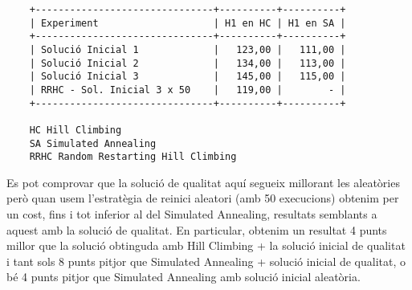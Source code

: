 \begin{verbatim}
	+-------------------------------+----------+----------+
	| Experiment                    | H1 en HC | H1 en SA |
	+-------------------------------+----------+----------+
	| Solució Inicial 1             |   123,00 |   111,00 |
	| Solució Inicial 2             |   134,00 |   113,00 |
	| Solució Inicial 3             |   145,00 |   115,00 |
	| RRHC - Sol. Inicial 3 x 50    |   119,00 |        - |
	+-------------------------------+----------+----------+

	HC Hill Climbing
	SA Simulated Annealing
	RRHC Random Restarting Hill Climbing
\end{verbatim}

                                          
Es pot comprovar que la solució de qualitat aquí segueix millorant les aleatòries però quan usem l'estratègia de reinici aleatori (amb 50 execucions) obtenim per un cost, fins i tot inferior al del Simulated Annealing, resultats semblants a aquest amb la solució de qualitat. En particular, obtenim un resultat 4 punts millor que la solució obtinguda amb Hill Climbing + la solució inicial de qualitat i tant sols 8 punts pitjor que Simulated Annealing + solució inicial de qualitat, o bé 4 punts pitjor que Simulated Annealing amb solució inicial aleatòria.

